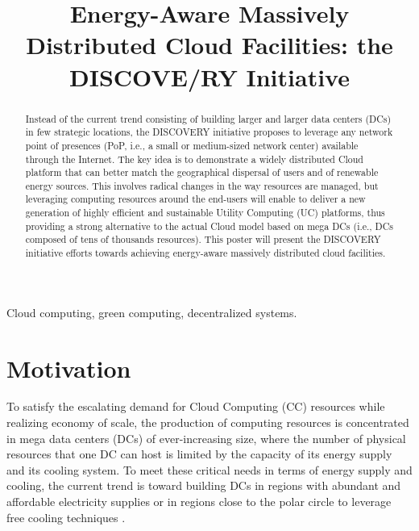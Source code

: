 \documentclass[conference]{IEEEtran}
\begin{document}
\title{Energy-Aware Massively Distributed Cloud Facilities: the DISCOVE/RY Initiative}

\author{
}


\maketitle

\begin{abstract}
Instead of the current trend consisting of building larger and larger data centers (DCs) in few strategic locations, the DISCOVERY initiative proposes to leverage any network point of presences (PoP, i.e., a small or medium-sized network center) available through the Internet. The key idea is to demonstrate a widely distributed Cloud platform that can better match the geographical dispersal of users and of renewable energy sources. This involves radical changes in the way resources are managed, but leveraging computing resources around the end-users will enable to deliver a new generation of highly efficient and sustainable Utility Computing (UC) platforms, thus providing a strong alternative to the actual Cloud model based on mega DCs (i.e., DCs composed of tens of thousands resources). This poster will present the DISCOVERY initiative efforts towards achieving energy-aware massively distributed cloud facilities.
\end{abstract}

\begin{IEEEkeywords}
Cloud computing, green computing, decentralized systems.
\end{IEEEkeywords}

\IEEEpeerreviewmaketitle


\section{Motivation}

To satisfy the escalating demand for Cloud Computing (CC) resources while
realizing economy of scale, the production of computing resources is
concentrated in mega data centers (DCs) of ever-increasing size, where
the number of physical resources that one DC can host is limited by
the capacity of its energy supply and its cooling system. To
meet these critical needs in terms of energy supply and cooling, the
current trend is toward building DCs in regions with abundant and
affordable electricity supplies or in regions close to the polar
circle to leverage free cooling techniques \cite{greenpeace:2013}.
\end{document}
